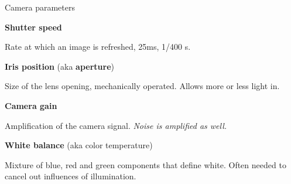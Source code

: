 \documentclass[compress]{beamer}
\begin{document}
\begin{frame}{Camera parameters}

    \textbf{Shutter speed}

    Rate at which an image is refreshed, \eg 25ms, 1/400 s.

    \textbf{Iris position} (aka \textbf{aperture})

    Size of the lens opening, mechanically operated. Allows more or less light
    in.

    \textbf{Camera gain}

    Amplification of the camera signal. \emph{Noise is amplified as well.}

    \textbf{White balance} (aka color temperature)

    Mixture of blue, red and green components that define white. Often needed
    to cancel out influences of illumination.

\end{frame}
\end{document}
